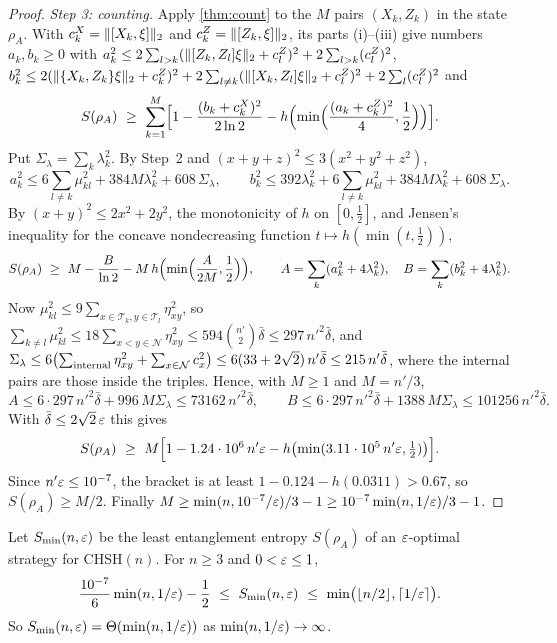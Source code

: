 \begin{proof}
\emph{Step 3: counting.} Apply \cref{thm:count} to the $M$ pairs $(X_k,Z_k)$ in the state $\rho_A$. With
$c^X_k=\lVert [X_k,\xi]\rVert_2$ and $c^Z_k=\lVert [Z_k,\xi]\rVert_2$, its parts (i)--(iii) give numbers $a_k,b_k\ge0$ with
$a_k^2\le2\sum_{l>k}(\lVert [Z_k,Z_l]\xi\rVert_2+c^Z_l)^2+2\sum_{l>k}(c^Z_l)^2$,
$b_k^2\le2(\lVert \{X_k,Z_k\}\xi\rVert_2+c^Z_k)^2+2\sum_{l\ne k}(\lVert [X_k,Z_l]\xi\rVert_2+c^Z_l)^2+2\sum_{l}(c^Z_l)^2$ and
\[
S(\rho_A)\ \ge\ \sum_{k=1}^M\Bigl[1-\frac{(b_k+c^X_k)^2}{2\ln2}-h\Bigl(\min\Bigl(\frac{(a_k+c^Z_k)^2}4,\frac12\Bigr)\Bigr)\Bigr].
\]
Put $\Sigma_\lambda=\sum_k\lambda_k^2$. By Step~2 and $(x+y+z)^2\le3(x^2+y^2+z^2)$,
\[
a_k^2\le6\sum_{l\ne k}\mu_{kl}^2+384M\lambda_k^2+608\,\Sigma_\lambda,\qquad b_k^2\le392\lambda_k^2+6\sum_{l\ne k}\mu_{kl}^2+384M\lambda_k^2+608\,\Sigma_\lambda .
\]
By $(x+y)^2\le2x^2+2y^2$, the monotonicity of $h$ on $[0,\frac12]$, and Jensen's inequality for the concave nondecreasing function
$t\mapsto h(\min(t,\frac12))$,
\[
S(\rho_A)\ \ge\ M-\frac{B}{\ln2}-M\,h\Bigl(\min\Bigl(\frac A{2M},\frac12\Bigr)\Bigr),\qquad A=\sum_k(a_k^2+4\lambda_k^2),\quad B=\sum_k(b_k^2+4\lambda_k^2).
\]
Now $\mu_{kl}^2\le9\sum_{x\in\mathcal T_k,y\in\mathcal T_l}\eta_{xy}^2$, so $\sum_{k\ne l}\mu_{kl}^2\le18\sum_{x<y\in\mathcal
N}\eta_{xy}^2\le594\binom{n'}2\bar\delta\le297\,n'^2\bar\delta$, and $\Sigma_\lambda\le6\bigl(\sum_{\rm internal}\eta_{xy}^2+\sum_{x\in\mathcal
N}c_x^2\bigr)\le6(33+2\sqrt2)\,n'\bar\delta\le215\,n'\bar\delta$, where the internal pairs are those inside the triples. Hence, with
$M\ge1$ and $M=n'/3$,
\[
A\le6\cdot297\,n'^2\bar\delta+996\,M\Sigma_\lambda\le73162\,n'^2\bar\delta,\qquad B\le6\cdot297\,n'^2\bar\delta+1388\,M\Sigma_\lambda\le101256\,n'^2\bar\delta .
\]
With $\bar\delta\le2\sqrt2\,\varepsilon$ this gives
\[
S(\rho_A)\ \ge\ M\Bigl[1-1.24\cdot10^6\,n'\eps-h\bigl(\min(3.11\cdot10^5\,n'\eps,\tfrac12)\bigr)\Bigr].
\]
Since $n'\varepsilon\le10^{-7}$, the bracket is at least $1-0.124-h(0.0311)>0.67$, so $S(\rho_A)\ge M/2$. Finally
$M\ge\min(n,10^{-7}/\varepsilon)/3-1\ge10^{-7}\min(n,1/\varepsilon)/3-1$.
\end{proof}

\begin{corollary}\label{cor:chsh-ebits}
Let $S_{\min}(n,\varepsilon)$ be the least entanglement entropy $S(\rho_A)$ of an $\varepsilon$-optimal strategy for CHSH$(n)$. For $n\ge3$ and
$0<\varepsilon\le1$,
\[
\frac{10^{-7}}6\min(n,1/\eps)-\frac12\ \le\ S_{\min}(n,\eps)\ \le\ \min\bigl(\lfloor n/2\rfloor,\lceil1/\eps\rceil\bigr).
\]
So $S_{\min}(n,\varepsilon)=\Theta(\min(n,1/\varepsilon))$ as $\min(n,1/\varepsilon)\to\infty$.
\end{corollary}

